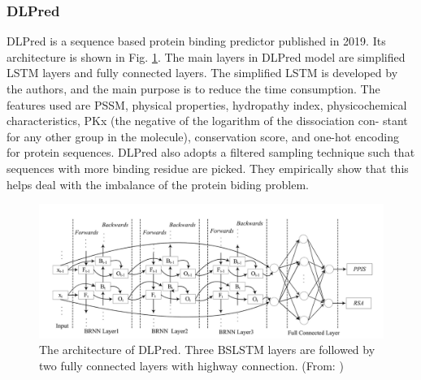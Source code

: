 \subsubsection{DLPred}
DLPred \cite{zhang2019sequence} is a sequence based protein binding predictor published in 2019. Its architecture is shown in Fig. \ref{fig_DLPred}. The main layers in DLPred model are simplified LSTM layers and fully connected layers. The simplified LSTM is developed by the authors, and the main purpose is to reduce the time consumption. The features used are PSSM, physical properties, hydropathy index, physicochemical characteristics, PKx (the negative of the logarithm of the dissociation con- stant for any other group in the molecule), conservation score, and one-hot encoding for protein sequences. DLPred also adopts a filtered sampling technique such that sequences with more binding residue are picked. They empirically show that this helps deal with the imbalance of the protein biding problem.
\begin{figure}[h!]
\begin{center}
\includegraphics[height = 6 cm]{img/DLPred.png}
\caption[The architecture of DLPred]{The architecture of DLPred. Three BSLSTM layers are followed by two fully connected layers with highway connection.  (From: \cite{zhang2019sequence})  \label{fig_DLPred}}
\end{center}
\end{figure} 

